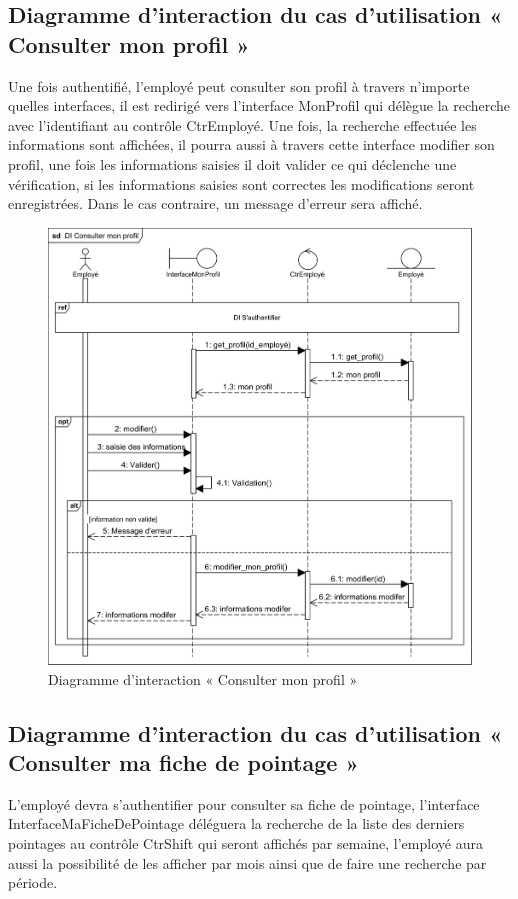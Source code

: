     \subsection*{Diagramme d'interaction du cas d'utilisation « Consulter mon profil »}
    Une fois authentifié, l’employé peut consulter son profil à travers n’importe quelles interfaces, il est redirigé vers l’interface MonProfil qui délègue la recherche avec l’identifiant au contrôle CtrEmployé. Une fois, la recherche effectuée les informations sont affichées, il pourra aussi à travers cette interface modifier son profil, une fois les informations saisies il doit valider ce qui déclenche une vérification, si les informations saisies sont correctes les modifications seront enregistrées. Dans le cas contraire, un message d’erreur sera affiché.
        \begin{figure}[h!]
                 \centering
                \includegraphics[scale=0.86]{images/DS/consulter_mon_profile}
                 \caption{Diagramme d'interaction « Consulter mon profil »}
                 \label{fig35}
        \end{figure}
    \clearpage
    
        \subsection*{Diagramme d'interaction du cas d'utilisation « Consulter ma fiche de pointage »}
        L’employé devra s’authentifier pour consulter sa fiche de pointage, l’interface InterfaceMaFicheDePointage déléguera la recherche de la liste des derniers pointages au contrôle CtrShift qui seront affichés par semaine, l’employé aura aussi la possibilité de les afficher par mois ainsi que de faire une recherche par période. 
        
